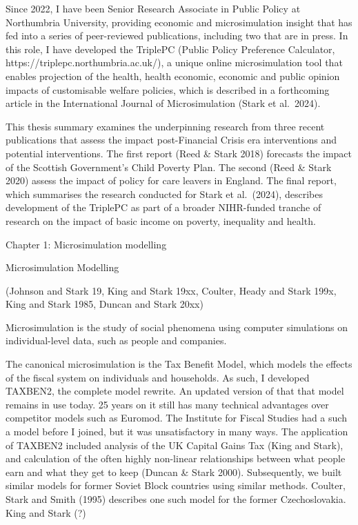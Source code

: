 \documentclass[
  letterpaper,
  DIV=11,
  numbers=noendperiod]{scrartcl}
\begin{document}
Since 2022, I have been Senior Research Associate in Public Policy at
Northumbria University, providing economic and microsimulation insight
that has fed into a series of peer-reviewed publications, including two
that are in press. In this role, I have developed the TriplePC (Public
Policy Preference Calculator, https://triplepc.northumbria.ac.uk/), a
unique online microsimulation tool that enables projection of the
health, health economic, economic and public opinion impacts of
customisable welfare policies, which is described in a forthcoming
article in the International Journal of Microsimulation (Stark et
al.~2024).

This thesis summary examines the underpinning research from three recent
publications that assess the impact post-Financial Crisis era
interventions and potential interventions. The first report (Reed \&
Stark 2018) forecasts the impact of the Scottish Government's Child
Poverty Plan. The second (Reed \& Stark 2020) assess the impact of
policy for care leavers in England. The final report, which summarises
the research conducted for Stark et al.~(2024), describes development of
the TriplePC as part of a broader NIHR-funded tranche of research on the
impact of basic income on poverty, inequality and health.

Chapter 1: Microsimulation modelling

Microsimulation Modelling

(Johnson and Stark 19, King and Stark 19xx, Coulter, Heady and Stark
199x, King and Stark 1985, Duncan and Stark 20xx)

Microsimulation is the study of social phenomena using computer
simulations on individual-level data, such as people and companies.

The canonical microsimulation is the Tax Benefit Model, which models the
effects of the fiscal system on individuals and households. As such, I
developed TAXBEN2, the complete model rewrite. An updated version of
that that model remains in use today. 25 years on it still has many
technical advantages over competitor models such as Euromod. The
Institute for Fiscal Studies had a such a model before I joined, but it
was unsatisfactory in many ways. The application of TAXBEN2 included
analysis of the UK Capital Gains Tax (King and Stark), and calculation
of the often highly non-linear relationships between what people earn
and what they get to keep (Duncan \& Stark 2000). Subsequently, we built
similar models for former Soviet Block countries using similar methods.
Coulter, Stark and Smith (1995) describes one such model for the former
Czechoslovakia. King and Stark (?)
\end{document}

